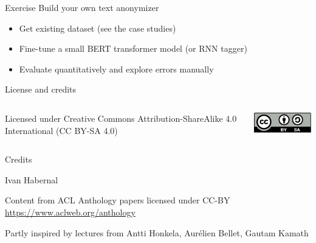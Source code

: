 \documentclass[12pt,aspectratio=169,handout]{beamer}
\begin{document}
\begin{frame}{Exercise}
Build your own text anonymizer
\begin{itemize}
\item Get existing dataset (see the case studies)
\item Fine-tune a small BERT transformer model (or RNN tagger)
\item Evaluate quantitatively and explore errors manually
\end{itemize}
\end{frame}



\begin{frame}{License and credits}

	\begin{columns}
		\begin{column}{0.7\textwidth}
			Licensed under Creative Commons Attribution-ShareAlike 4.0 International (CC BY-SA 4.0)
		\end{column}
		\begin{column}{0.2\textwidth}
			\includegraphics[width=0.9\linewidth]{img/cc-by-sa-icon.pdf}
		\end{column}
	\end{columns}
	
	\bigskip
	
	Credits
	
	\begin{scriptsize}
		
		Ivan Habernal
		
		Content from ACL Anthology papers licensed under CC-BY \url{https://www.aclweb.org/anthology}
		
		Partly inspired by lectures from Antti Honkela, Aurélien Bellet, Gautam Kamath
	
	\end{scriptsize}
	
\end{frame}
\end{document}
